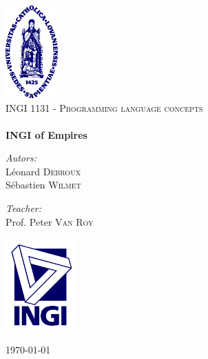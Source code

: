 \documentclass[12pt,a4paper,oneside]{article}      %
\begin{document}
\begin{titlepage}
\begin{center}
 

\includegraphics[width=0.15\textwidth]{images/ucl.png}
\vfill
\textsc{\LARGE }\\[1.2cm]
\textsc{\Large INGI 1131 - Programming language concepts}\\[0.5cm]
 

\hrulefill 
\\[0.4cm]
{ \huge \bfseries INGI of Empires}
\\[0.4cm]
\hrulefill
\vfill
 

\begin{minipage}{0.4\textwidth}
\begin{flushleft} \large
\emph{Autors:}\\
Léonard \textsc{Debroux}\\
Sébastien \textsc{Wilmet}\\
\end{flushleft}
\end{minipage}
\begin{minipage}{0.4\textwidth}
\begin{flushright} \large
\emph{Teacher:} \\
Prof. Peter \textsc{Van Roy} \\
\end{flushright}
\end{minipage}
\vfill
\includegraphics[width=0.20\textwidth]{images/logoingi.png}\\
\vfill


{\large \today} 
\end{center}
\end{titlepage}
\end{document}
